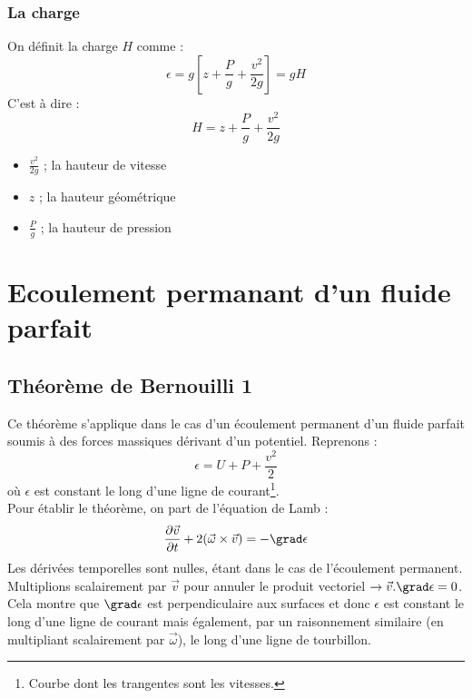 \subsubsection{La charge}
On définit la charge $H$ comme :
\begin{equation}
	\epsilon = g\left[z+\frac{P}{g}+\frac{v^2}{2g}\right] = gH
\end{equation}
C'est à dire :
\begin{equation}
	H = z + \frac{P}{g}+\frac{v^2}{2g}
\end{equation}
\begin{itemize}
	\item $\frac{v^2}{2g}$ ; la hauteur de vitesse
	\item $z$ ; la hauteur géométrique
	\item $\frac{P}{g}$ ; la hauteur de pression
\end{itemize}

	
\section{Ecoulement permanant d'un fluide parfait}
\subsection{Théorème de Bernouilli 1}
Ce théorème s'applique dans le cas d'un écoulement permanent d'un fluide parfait 
soumis à des forces massiques dérivant d'un potentiel. Reprenons :
\begin{equation}
	\epsilon = U + P + \frac{v^2}{2}
\end{equation}
où $\epsilon$ est constant le long d'une ligne de courant\footnote{Courbe dont les
	trangentes sont les vitesses.}.\\
	
Pour établir le théorème, on part de l'équation de Lamb :
\begin{equation}
	\frac{\partial\vec{v}}{\partial t} + 2(\vec{\omega}\times\vec{v}) = -\grad \epsilon
\end{equation}
Les dérivées temporelles sont nulles, étant dans le cas de l'écoulement permanent.
Multiplions scalairement par $\vec{v}$ pour annuler le produit vectoriel $\rightarrow
\vec{v}.\grad \epsilon = 0$. Cela montre que $\grad \epsilon$ est perpendiculaire
aux surfaces et donc $\epsilon$ est constant le long d'une ligne de courant mais
également, par un raisonnement similaire (en multipliant scalairement par $\vec{
	\omega}$), le long d'une ligne de tourbillon.
		
